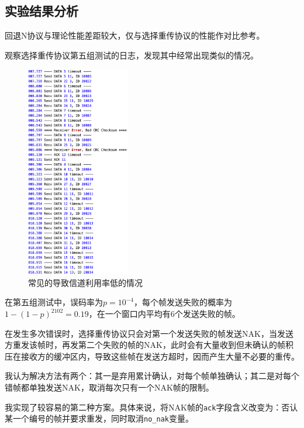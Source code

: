 \documentclass[lang=cn,11pt,a4paper,cite=authornum]{paper}
\begin{document}
\subsection{实验结果分析}

回退N协议与理论性能差距较大，仅与选择重传协议的性能作对比参考。

观察选择重传协议第五组测试的日志，发现其中经常出现类似的情况。

\begin{figure}[htbp]

    \centering\includegraphics[width=0.4\textwidth]{./Images/img1.png}

    \caption{常见的导致信道利用率低的情况\label{fig:img1}}

\end{figure}

在第五组测试中，误码率为$p=10^{-4}$，每个帧发送失败的概率为$1-(1-p)^{2102}=0.19$，在一个窗口内平均有6个发送失败的帧。

在发生多次错误时，选择重传协议只会对第一个发送失败的帧发送NAK，当发送方重发该帧时，再发第二个失败的帧的NAK，此时会有大量收到但未确认的帧积压在接收方的缓冲区内，导致这些帧在发送方超时，因而产生大量不必要的重传。

我认为解决方法有两个：其一是弃用累计确认，对每个帧单独确认；其二是对每个错帧都单独发送NAK，取消每次只有一个NAK帧的限制。

我实现了较容易的第二种方案。具体来说，将NAK帧的\texttt{ack}字段含义改变为：否认某一个编号的帧并要求重发，同时取消\texttt{no_nak}变量。
\end{document}
